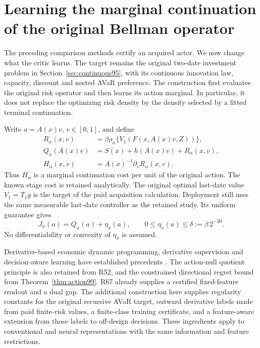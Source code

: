 \section{Learning the marginal continuation of the original Bellman operator}
\label{sec:marginal121}

The preceding comparison methods certify an acquired actor.  We now change
what the critic learns.  The target remains the original two-date
investment problem in Section~\ref{sec:continuous95}, with its continuous
innovation law, capacity, discount and nested AVaR preference.  The
construction first evaluates the original risk operator and then learns
its action marginal.  In particular, it does not replace the optimizing
risk density by the density selected by a fitted terminal continuation.

Write \(a=A(x)v\), \(v\in[0,1]\), and define
\begin{align}
 R_\alpha(x,v)
   &=\beta\rho_\alpha\{V_1(F(x,A(x)v,Z))\},\label{eq:rootcritic121}\\
 Q_x(A(x)v)&=S(x)+h(A(x)v)+R_\alpha(x,v),\nonumber\\
 H_\alpha(x,v)&=A(x)^{-1}\partial_vR_\alpha(x,v).\nonumber
\end{align}
Thus \(H_\alpha\) is a marginal continuation cost per unit of the
original action.  The known stage cost is retained analytically.
The original optimal last-date value \(V_1=T_1g\) is the target of the
paid acquisition calculation.  Deployment still uses the same measurable
last-date controller as the retained study.  Its uniform guarantee gives
\begin{equation}\label{eq:future121}
 J_x(a)=Q_x(a)+\eta_x(a),\qquad
 0\leq\eta_x(a)\leq\delta:=\beta\,2^{-20}.
\end{equation}
No differentiability or convexity of \(\eta_x\) is assumed.

Derivative-based economic dynamic programming, derivative supervision
and decision-aware learning have established precedents
\citep{CaiJudd2015,Czarnecki2017Sobolev,Donti2017Task,ElmachtoubGrigas2022}.
The action-null quotient principle is also retained from R52, and the
constrained directional regret bound from Theorem~\ref{thm:action99}.
R67 already supplies a certified fixed-feature readout and a dual gap.
The additional construction here supplies regularity constants for the
original recursive AVaR target, outward derivative labels made from paid
finite-risk values, a finite-class training certificate, and a
feature-aware extension from those labels to off-design decisions.
These ingredients apply to conventional and neural representations with
the same information and feature restrictions.

